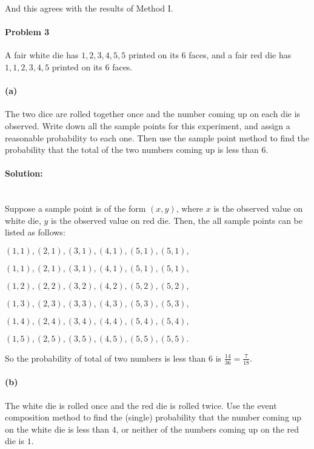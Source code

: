 \documentclass[a4paper, 11pt, twoside]{article}
\begin{document}
And this agrees with the results of Method I.

\pagebreak

\paragraph{Problem 3}

A fair white die has $1,2,3,4,5,5$ printed on its $6$ faces, and a fair red die has $1,1,2,3,4,5$ printed on its $6$ faces.

\paragraph{(a)} The two dice are rolled together once and the number coming up on each die is observed. Write down all the sample points for this experiment, and assign a reasonable probability to each one. Then use the sample point method to find the probability that the total of the two numbers coming up is less than $6$.

\paragraph{Solution:}\ \\

Suppose a sample point is of the form $(x,y)$, where $x$ is the observed value on white die, $y$ is the observed value on red die. Then, the all sample points can be listed as follows:

$(1,1), (2,1), (3,1), (4,1), (5,1), (5,1),$

$(1,1), (2,1), (3,1), (4,1), (5,1), (5,1),$

$(1,2), (2,2), (3,2), (4,2), (5,2), (5,2),$

$(1,3), (2,3), (3,3), (4,3), (5,3), (5,3),$

$(1,4), (2,4), (3,4), (4,4), (5,4), (5,4),$

$(1,5), (2,5), (3,5), (4,5), (5,5), (5,5).$

So the probability of total of two numbers is less than $6$ is $\frac{14}{36}=\frac{7}{18}.$

\paragraph{(b)} The white die is rolled once and the red die is rolled twice. Use the event composition method to find the (single) probability that the number coming up on the white die is less than $4$, or neither of the numbers coming up on the red die is $1$.
\end{document}
